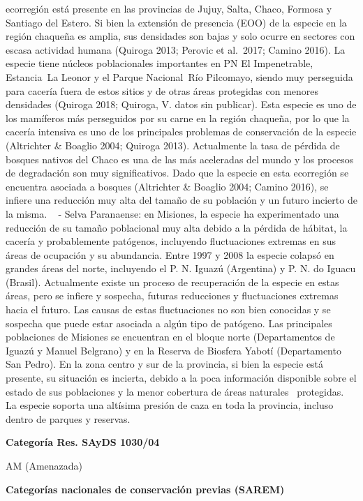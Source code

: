 \documentclass[
  x11names]{article}
\begin{document}
ecorregión está presente en las provincias de Jujuy, Salta, Chaco,
Formosa y Santiago del Estero. Si bien la extensión de presencia (EOO)
de la especie en la región chaqueña es amplia, sus densidades son bajas
y solo ocurre en sectores con escasa actividad humana (Quiroga 2013;
Perovic et al.~2017; Camino 2016). La especie tiene núcleos
poblacionales importantes en PN El Impenetrable, Estancia~La Leonor y el
Parque Nacional~Río Pilcomayo, siendo muy perseguida para cacería fuera
de estos sitios y de otras áreas protegidas con menores densidades
(Quiroga 2018; Quiroga, V. datos sin publicar). Esta especie es uno de
los mamíferos más perseguidos por su carne en la región chaqueña, por lo
que la cacería intensiva es uno de los principales problemas de
conservación de la especie (Altrichter \& Boaglio 2004; Quiroga 2013).
Actualmente la tasa de pérdida de bosques nativos del Chaco es una de
las más aceleradas del mundo y los procesos de degradación son muy
significativos. Dado que la especie en esta ecorregión se encuentra
asociada a bosques (Altrichter \& Boaglio 2004; Camino 2016), se infiere
una reducción muy alta del tamaño de su población y un futuro incierto
de la misma. ~ - Selva Paranaense: en Misiones, la especie ha
experimentado una reducción de su tamaño poblacional muy alta debido a
la pérdida de hábitat, la cacería y probablemente patógenos, incluyendo
fluctuaciones extremas en sus áreas de ocupación y su abundancia. Entre
1997 y 2008 la especie colapsó en grandes áreas del norte, incluyendo el
P. N. Iguazú (Argentina) y P. N. do Iguacu (Brasil). Actualmente existe
un proceso de recuperación de la especie en estas áreas, pero se infiere
y sospecha, futuras reducciones y fluctuaciones extremas hacia el
futuro. Las causas de estas fluctuaciones no son bien conocidas y se
sospecha que puede estar asociada a algún tipo de patógeno. Las
principales poblaciones de Misiones se encuentran en el bloque norte
(Departamentos de Iguazú y Manuel Belgrano) y en la Reserva de Biosfera
Yabotí (Departamento San Pedro). En la zona centro y sur de la
provincia, si bien la especie está presente, su situación es incierta,
debido a la poca información disponible sobre el estado de sus
poblaciones y la menor cobertura de áreas naturales~ protegidas. La
especie soporta una altísima presión de caza en toda la provincia,
incluso dentro de parques y reservas.

\textbf{Categoría Res. SAyDS 1030/04}

AM (Amenazada)

\textbf{Categorías nacionales de conservación previas (SAREM)}
\end{document}
